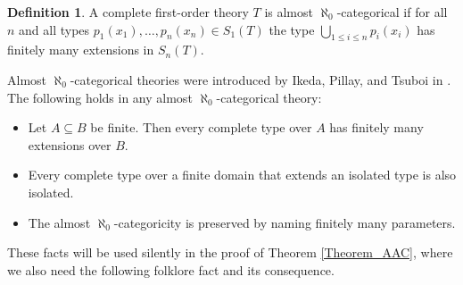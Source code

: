 \documentclass{amsart}
\theoremstyle{definition}
\theoremstyle{definition}
\newtheorem{Definition}[Theorem]{Definition}
\begin{document}
\begin{Definition}\label{Definition AAC} A complete first-order theory $T$ is almost $\aleph_0$-categorical if for all $n$ and all types $p_1(x_1),\ldots, p_n(x_n)\in S_1(T)$ the type $\bigcup_{1\leqslant i\leqslant n}p_i(x_i)$ has finitely many extensions in $S_n(T)$. 
\end{Definition}
Almost $\aleph_0$-categorical theories were introduced by Ikeda, Pillay, and Tsuboi in \cite{Ikeda}. The following holds in any almost $\aleph_0$-categorical theory:
\begin{itemize}
    \item Let $A\subseteq B$ be finite. Then every complete type over $A$ has finitely many extensions over $B$.
    \item Every complete type over a finite domain that extends an isolated type is also isolated.
    \item The almost $\aleph_0$-categoricity is preserved by naming finitely many parameters. 
\end{itemize}
These facts will be used silently in the proof of Theorem \ref{Theorem_AAC}, where we also need the following folklore fact and its consequence. 
\end{document}
